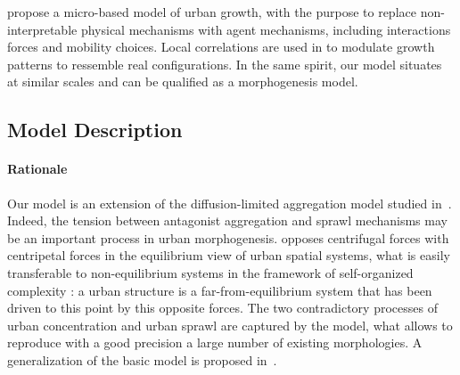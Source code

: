 \cite{andersson2002urban} propose a micro-based model of urban growth, with the purpose to replace non-interpretable physical mechanisms with agent mechanisms, including interactions forces and mobility choices. Local correlations are used in \cite{makse1998modeling} to modulate growth patterns to ressemble real configurations. In the same spirit, our model situates at similar scales and can be qualified as a morphogenesis model.



\subsection{Model Description}




\paragraph{Rationale}



Our model is an extension of the diffusion-limited aggregation model studied in~\cite{batty2006hierarchy}. Indeed, the tension between antagonist aggregation and sprawl mechanisms may be an important process in urban morphogenesis. \cite{fujita1996economics} opposes centrifugal forces with centripetal forces in the equilibrium view of urban spatial systems, what is easily transferable to non-equilibrium systems in the framework of self-organized complexity : a urban structure is a far-from-equilibrium system that has been driven to this point by this opposite forces. The two contradictory processes of urban concentration and urban sprawl are captured by the model, what allows to reproduce with a good precision a large number of existing morphologies. A generalization of the basic model is proposed in~\cite{raimbault2016calibration}. 



